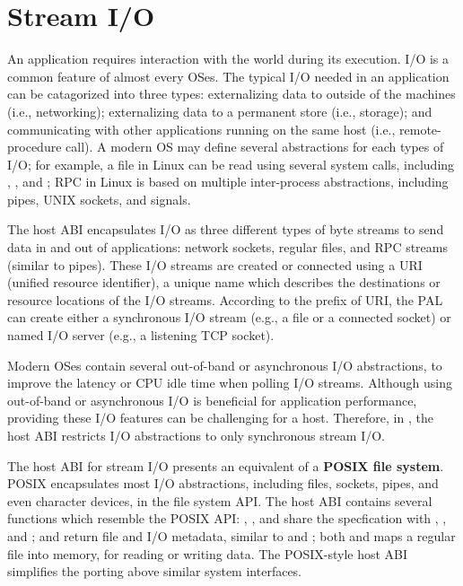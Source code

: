 \section{Stream I/O}
\label{sec:abi:streams}


An application requires interaction with the world during its execution.
I/O is a common feature of almost every OSes.
The typical I/O needed in an application
can be catagorized into three types:
externalizing data to outside of the machines (i.e., networking);
externalizing data to a permanent store (i.e., storage);
and communicating with other applications running on the same host (i.e., remote-procedure call).
A modern OS may define several abstractions
for each types of I/O; for example, a file in Linux can be read using several system calls,
including , , and ;
RPC in Linux is based on multiple inter-process abstractions,
including pipes, UNIX sockets, and signals.




The host ABI
encapsulates I/O as three different types of byte streams
to send data in and out of applications:
network sockets, regular files, and RPC streams (similar to pipes).
These I/O streams
are created or connected using a URI (unified resource identifier),
a unique name which describes the destinations or resource locations of the I/O streams.
According to the prefix of URI,
the PAL can create either a synchronous I/O stream (e.g., a file or a connected socket)
or named I/O server (e.g., a listening TCP socket).


Modern OSes contain several out-of-band or asynchronous I/O abstractions, to improve the latency or CPU idle time
when polling I/O streams.
Although using out-of-band or asynchronous I/O is beneficial for application performance,
providing these I/O features can be challenging for a host.
Therefore, in \graphene{}, the host ABI restricts I/O abstractions to only synchronous stream I/O.



The host ABI for stream I/O presents an equivalent of a {\bf POSIX file system}.
POSIX
encapsulates most I/O abstractions,
including files, sockets, pipes, and even character devices,
in the file system API.
The host ABI contains several functions
which resemble the POSIX API:
, , and 
share the specfication with , , and ;
 and  return file and I/O metadata, similar to  and ;
both  and  maps a regular file into memory, for reading or writing data.
The POSIX-style host ABI
simplifies the porting above
similar system interfaces.






